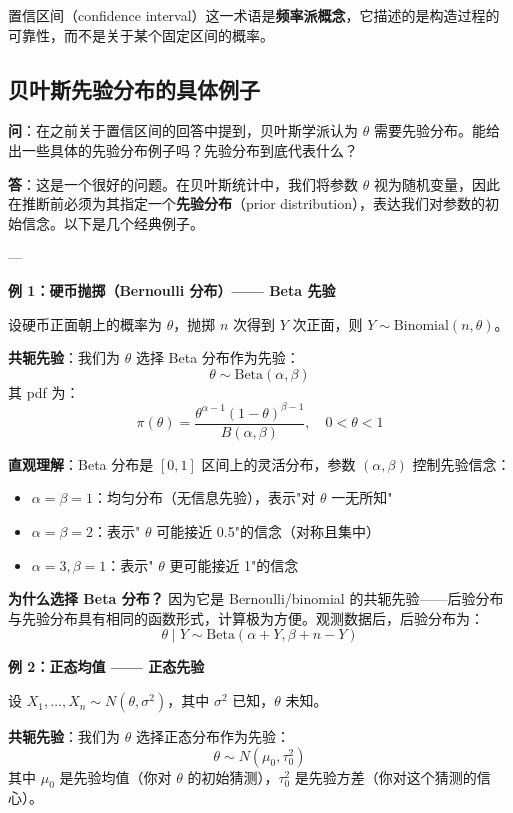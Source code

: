 置信区间（confidence interval）这一术语是\textbf{频率派概念}，它描述的是构造过程的可靠性，而不是关于某个固定区间的概率。

\subsection{贝叶斯先验分布的具体例子}\label{sec:qa-bayesian-prior-examples}

\textbf{问}：在之前关于置信区间的回答中提到，贝叶斯学派认为 $\theta$ 需要先验分布。能给出一些具体的先验分布例子吗？先验分布到底代表什么？

\textbf{答}：这是一个很好的问题。在贝叶斯统计中，我们将参数 $\theta$ 视为随机变量，因此在推断前必须为其指定一个\textbf{先验分布}（prior distribution），表达我们对参数的初始信念。以下是几个经典例子。

---

\textbf{例 1：硬币抛掷（Bernoulli 分布）—— Beta 先验}

设硬币正面朝上的概率为 $\theta$，抛掷 $n$ 次得到 $Y$ 次正面，则 $Y \sim \text{Binomial}(n, \theta)$。

\textbf{共轭先验}：我们为 $\theta$ 选择 Beta 分布作为先验：
\[
\theta \sim \text{Beta}(\alpha, \beta)
\]
其 pdf 为：
\[
\pi(\theta) = \frac{\theta^{\alpha-1}(1-\theta)^{\beta-1}}{B(\alpha, \beta)}, \quad 0 < \theta < 1
\]

\textbf{直观理解}：Beta 分布是 $[0,1]$ 区间上的灵活分布，参数 $(\alpha, \beta)$ 控制先验信念：
\begin{itemize}
\item $\alpha = \beta = 1$：均匀分布（无信息先验），表示"对 $\theta$ 一无所知"
\item $\alpha = \beta = 2$：表示" $\theta$ 可能接近 0.5"的信念（对称且集中）
\item $\alpha = 3, \beta = 1$：表示" $\theta$ 更可能接近 1"的信念
\end{itemize}

\textbf{为什么选择 Beta 分布？} 因为它是 Bernoulli/binomial 的共轭先验——后验分布与先验分布具有相同的函数形式，计算极为方便。观测数据后，后验分布为：
\[
\theta \mid Y \sim \text{Beta}(\alpha + Y, \beta + n - Y)
\]

\textbf{例 2：正态均值 —— 正态先验}

设 $X_1, \ldots, X_n \sim N(\theta, \sigma^2)$，其中 $\sigma^2$ 已知，$\theta$ 未知。

\textbf{共轭先验}：我们为 $\theta$ 选择正态分布作为先验：
\[
\theta \sim N(\mu_0, \tau_0^2)
\]
其中 $\mu_0$ 是先验均值（你对 $\theta$ 的初始猜测），$\tau_0^2$ 是先验方差（你对这个猜测的信心）。

